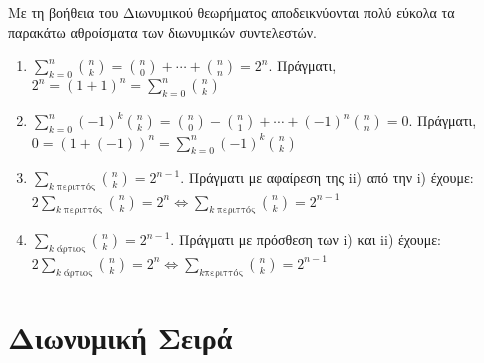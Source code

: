 Με τη βοήθεια του Διωνυμικού θεωρήματος αποδεικνύονται πολύ εύκολα τα παρακάτω 
αθροίσματα των διωνυμικών συντελεστών.
\begin{prop}
\item {}
  \begin{enumerate}
    \item $ \sum_{k=0}^{n} \binom{n}{k} = \binom{n}{0} +\cdots+ \binom{n}{n} =  2^{n} $. 
      Πράγματι, $ 2^{n}=(1+1)^{n} =
      \sum_{k=0}^{n} \binom{n}{k} $
    \item $ \sum_{k=0}^{n} (-1)^k \binom{n}{k} = \binom{n}{0} - \binom{n}{1} +\cdots
      +(-1)^{n} \binom{n}{n} = 0 $. Πράγματι, $ 0 = (1+(-1))^{n} = 
      \sum_{k=0}^{n} (-1)^{k}\binom{n}{k} $
    \item $ \sum_{k \; \text{περιττός}} \binom{n}{k} = 2^{n-1} $. 
      Πράγματι με αφαίρεση της ii) από την i) έχουμε: $ 2 \sum_{k \; \text{περιττός}} 
      \binom{n}{k} = 2^{n} \Leftrightarrow \sum_{k \; \text{περιττός}}
      \binom{n}{k} = 2^{n-1} $
    \item $ \sum_{k \; \text{άρτιος}} \binom{n}{k} = 2^{n-1} $. 
      Πράγματι με πρόσθεση των i) και ii) έχουμε: $ 2 \sum_{k \; \text{άρτιος}}
      \binom{n}{k} = 2^{n} \Leftrightarrow \sum_{k \text{περιττός}} \binom{n}{k}
      = 2^{n-1} $
  \end{enumerate}
\end{prop}



\section*{Διωνυμική Σειρά}


